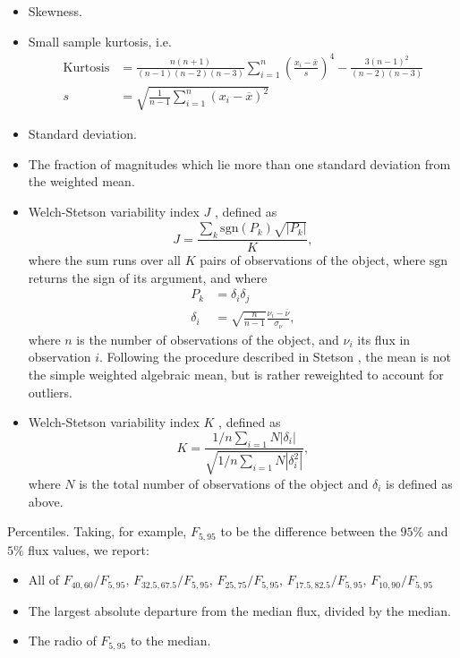 \begin{itemize}
\item{Skewness.}
\item{Small sample kurtosis, i.e.
\begin{align}
\mathrm{Kurtosis} &= \frac{n(n+1)}{(n-1)(n-2)(n-3)} \sum_{i=1}^{n} \left(\frac{x_i - \overline{x}}{s}\right)^4 -\frac{3(n-1)^2}{(n-2)(n-3)} \\
s &= \sqrt{\frac{1}{n-1} \sum_{i=1}^{n}(x_i - \overline{x})^2}
\end{align}
}
\item{Standard deviation.}
\item{The fraction of magnitudes which lie more than one standard deviation from the weighted mean.}
\item{Welch-Stetson variability index $J$ \cite{Stetson96}, defined as
\[
J = \frac{\sum_{k} \mathrm{sgn}(P_k) \sqrt{|P_k|}}{K},
\]
where the sum runs over all $K$ pairs of observations of the object, where $\mathrm{sgn}$ returns the sign of its argument, and where
\begin{align}
P_k &= \delta_i \delta_j \\
\delta_i &= \sqrt{\frac{n}{n-1}}\frac{\nu_i - \overline{\nu}}{\sigma_{\nu}},
\end{align}
where $n$ is the number of observations of the object, and $\nu_i$ its flux in observation $i$. Following the procedure described in Stetson \cite{Stetson96}, the mean is not the simple weighted algebraic mean, but is rather reweighted to account for outliers.}
\item{Welch-Stetson variability index $K$ \cite{Stetson96}, defined as
\[
K = \frac{1/n \sum_{i=1}{N}|\delta_i|}{\sqrt{1/n \sum_{i=1}{N}|\delta_i^2|}},
\]
where $N$ is the total number of observations of the object and $\delta_i$ is defined as above.}
\end{itemize}

Percentiles. Taking, for example, $F_{5,95}$ to be the difference between the $95\%$ and $5\%$ flux values, we report:

\begin{itemize}
\item{All of $F_{40,60} / F_{5,95}$, $F_{32.5,67.5} / F_{5,95}$, $F_{25,75} / F_{5,95}$, $F_{17.5,82.5} / F_{5,95}$, $F_{10,90} / F_{5,95}$}
\item{The largest absolute departure from the median flux, divided by the
median.}
\item{The radio of $F_{5,95}$ to the median.}
\end{itemize}


